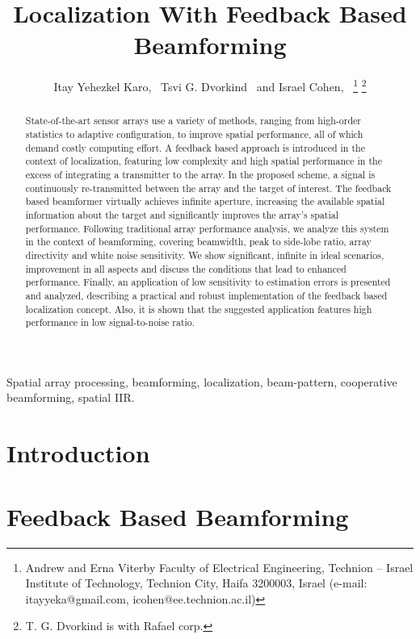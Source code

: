 \documentclass[journal]{IEEEtran}
\begin{document}
\title{Localization With Feedback Based Beamforming}
\author{Itay Yehezkel Karo,~\IEEEmembership{}
        Tsvi G. Dvorkind~\IEEEmembership{}
        and 
        Israel Cohen,~
\thanks{Andrew and Erna Viterby Faculty of Electrical Engineering, Technion -- Israel Institute of Technology, Technion City, Haifa 3200003, Israel (e-mail: itayyeka@gmail.com, icohen@ee.technion.ac.il)}%
\thanks{T. G. Dvorkind is with Rafael corp.}%
}
\markboth{}%
{}
\maketitle
\begin{abstract}
State-of-the-art sensor arrays use a variety of methods, ranging from high-order statistics to adaptive configuration, to improve spatial performance, all of which demand costly computing effort.
A feedback based approach is introduced in the context of localization, featuring low complexity and high spatial performance in the excess of integrating a transmitter to the array.  
In the proposed scheme, a signal is continuously re-transmitted between the array and the target of interest.
The feedback based beamformer virtually achieves infinite aperture, increasing the available spatial information about the target and significantly improves the array's spatial performance.
Following traditional array performance analysis, we analyze this system in the context of beamforming, covering beamwidth, peak to side-lobe ratio, array directivity and white noise sensitivity. 
We show significant, infinite in ideal scenarios, improvement in all aspects and discuss the conditions that lead to enhanced performance.
Finally, an application of low sensitivity to estimation errors is presented and analyzed, describing a practical and robust implementation of the feedback based localization concept. 
Also, it is shown that the suggested application features high performance in low signal-to-noise ratio.  
\end{abstract}
\begin{IEEEkeywords}
Spatial array processing, beamforming, localization, beam-pattern, cooperative beamforming, spatial IIR.
\end{IEEEkeywords}
\section{Introduction}

\section{Feedback Based Beamforming}
\label{sec_introduceFeedback}

\end{document}
